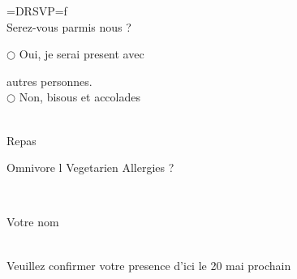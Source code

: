 \documentclass{letter}
\newcommand{\dotrule}[1]{%
   \parbox[t]{#1}{\hrulefill}}
\begin{document}
\centering
{\centering \carolyna\fontsize{48}{50}\selectfont =DRSVP=f}\\
\vspace{5mm}
{\imfell \large Serez-vous parmis nous ? }\\
\vspace{2.5mm}
{\imfell $\bigcirc$ Oui, je serai present avec \dotrule{10mm} autres personnes.\\
$\bigcirc$ Non, bisous et accolades} \\
\vspace{7.5mm}
{\imfell \large Repas}\\
\vspace{2.5mm}
{ Omnivore \hspace{5mm} {\vege l} Vegetarien \hspace{5mm} Allergies ?  \dotrule{20mm}} \\
\vspace{7.5mm}
{\imfell Votre nom \dotrule{50mm}}\\
\vspace{\fill}
{\centering \imfell Veuillez confirmer votre presence d'ici le 20 mai prochain} \\
\end{document}
